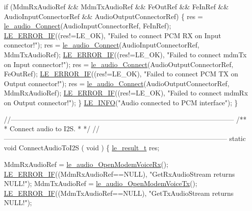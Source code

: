 \begin{DoxyCodeInclude}
{{{{    \textcolor{keywordflow}{if} (MdmRxAudioRef && MdmTxAudioRef && FeOutRef && FeInRef &&
        AudioInputConnectorRef && AudioOutputConnectorRef)
    \{
        res = \hyperlink{le__audio__interface_8h_a338df65b2fb1ae0140d86880adbcf0de}{le\_audio\_Connect}(AudioInputConnectorRef, FeInRef);
        \hyperlink{le__log_8h_aceaf11a11691d6c676e36dd317b38dbd}{LE\_ERROR\_IF}((res!=LE\_OK), \textcolor{stringliteral}{"Failed to connect PCM RX on Input connector!"});
        res = \hyperlink{le__audio__interface_8h_a338df65b2fb1ae0140d86880adbcf0de}{le\_audio\_Connect}(AudioInputConnectorRef, MdmTxAudioRef);
        \hyperlink{le__log_8h_aceaf11a11691d6c676e36dd317b38dbd}{LE\_ERROR\_IF}((res!=LE\_OK), \textcolor{stringliteral}{"Failed to connect mdmTx on Input connector!"});
        res = \hyperlink{le__audio__interface_8h_a338df65b2fb1ae0140d86880adbcf0de}{le\_audio\_Connect}(AudioOutputConnectorRef, FeOutRef);
        \hyperlink{le__log_8h_aceaf11a11691d6c676e36dd317b38dbd}{LE\_ERROR\_IF}((res!=LE\_OK), \textcolor{stringliteral}{"Failed to connect PCM TX on Output connector!"});
        res = \hyperlink{le__audio__interface_8h_a338df65b2fb1ae0140d86880adbcf0de}{le\_audio\_Connect}(AudioOutputConnectorRef, MdmRxAudioRef);
        \hyperlink{le__log_8h_aceaf11a11691d6c676e36dd317b38dbd}{LE\_ERROR\_IF}((res!=LE\_OK), \textcolor{stringliteral}{"Failed to connect mdmRx on Output connector!"});
    \}
    \hyperlink{le__log_8h_a23e6d206faa64f612045d688cdde5808}{LE\_INFO}(\textcolor{stringliteral}{"Audio connected to PCM interface"});
\}

\textcolor{comment}{//--------------------------------------------------------------------------------------------------}\textcolor{comment}{}
\textcolor{comment}{/**}
\textcolor{comment}{ * Connect audio to I2S.}
\textcolor{comment}{ *}
\textcolor{comment}{ */}
\textcolor{comment}{//--------------------------------------------------------------------------------------------------}
\textcolor{keyword}{static} \textcolor{keywordtype}{void} ConnectAudioToI2S
(
    \textcolor{keywordtype}{void}
)
\{
    \hyperlink{le__basics_8h_a1cca095ed6ebab24b57a636382a6c86c}{le\_result\_t} res;

    MdmRxAudioRef = \hyperlink{le__audio__interface_8h_ae3ed568ba4d2763ea77e17e77b20ff02}{le\_audio\_OpenModemVoiceRx}();
    \hyperlink{le__log_8h_aceaf11a11691d6c676e36dd317b38dbd}{LE\_ERROR\_IF}((MdmRxAudioRef==NULL), \textcolor{stringliteral}{"GetRxAudioStream returns NULL!"});
    MdmTxAudioRef = \hyperlink{le__audio__interface_8h_ad745f008bb04873c817da7af3daf783d}{le\_audio\_OpenModemVoiceTx}();
    \hyperlink{le__log_8h_aceaf11a11691d6c676e36dd317b38dbd}{LE\_ERROR\_IF}((MdmTxAudioRef==NULL), \textcolor{stringliteral}{"GetTxAudioStream returns NULL!"});

}}}}
\end{DoxyCodeInclude}
